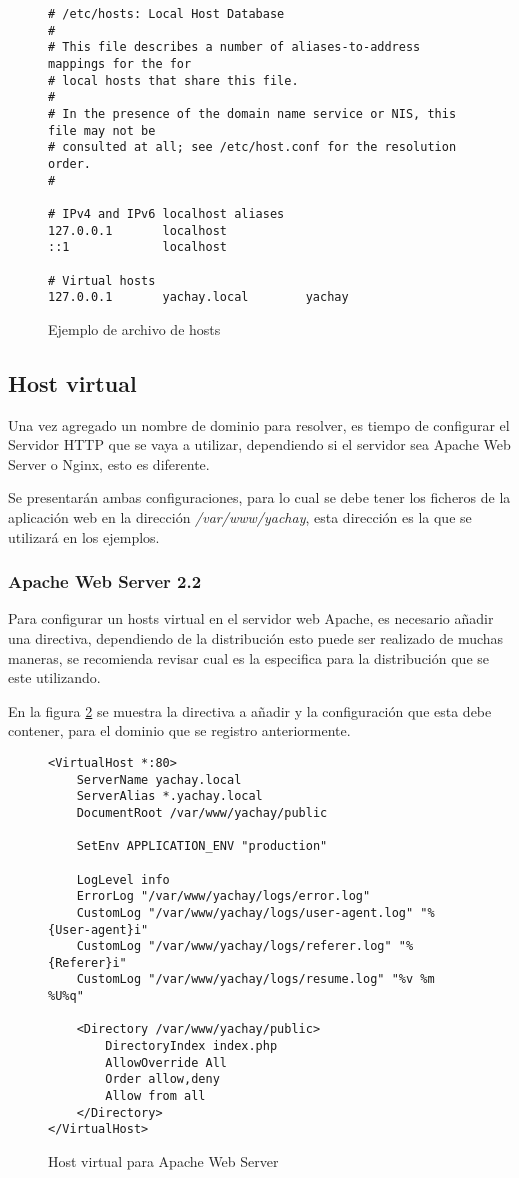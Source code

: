 \begin{figure}
\begin{verbatim}
# /etc/hosts: Local Host Database
#
# This file describes a number of aliases-to-address mappings for the for 
# local hosts that share this file.
#
# In the presence of the domain name service or NIS, this file may not be 
# consulted at all; see /etc/host.conf for the resolution order.
#

# IPv4 and IPv6 localhost aliases
127.0.0.1       localhost
::1             localhost

# Virtual hosts
127.0.0.1       yachay.local        yachay
\end{verbatim}
\caption{Ejemplo de archivo de hosts}
\label{config_hosts}
\end{figure}

\subsection{Host virtual}
Una vez agregado un nombre de dominio para resolver, es tiempo de configurar el
Servidor HTTP que se vaya a utilizar, dependiendo si el servidor sea Apache Web
Server o Nginx, esto es diferente.

Se presentarán ambas configuraciones, para lo cual se debe tener los ficheros
de la aplicación web en la dirección \emph{/var/www/yachay}, esta dirección es
la que se utilizará en los ejemplos.

\subsubsection{Apache Web Server 2.2}
Para configurar un hosts virtual en el servidor web Apache, es necesario añadir
una directiva, dependiendo de la distribución esto puede ser realizado de muchas
maneras, se recomienda revisar cual es la especifica para la distribución que se
este utilizando.

En la figura \ref{config_apache} se muestra la directiva a añadir y la
configuración que esta debe contener, para el dominio que se registro
anteriormente.

\begin{figure}
\begin{verbatim}
<VirtualHost *:80>
    ServerName yachay.local
    ServerAlias *.yachay.local
    DocumentRoot /var/www/yachay/public

    SetEnv APPLICATION_ENV "production"

    LogLevel info
    ErrorLog "/var/www/yachay/logs/error.log"
    CustomLog "/var/www/yachay/logs/user-agent.log" "%{User-agent}i"
    CustomLog "/var/www/yachay/logs/referer.log" "%{Referer}i"
    CustomLog "/var/www/yachay/logs/resume.log" "%v %m %U%q"

    <Directory /var/www/yachay/public>
        DirectoryIndex index.php
        AllowOverride All
        Order allow,deny
        Allow from all
    </Directory>
</VirtualHost>
\end{verbatim}
\caption{Host virtual para Apache Web Server}
\label{config_apache}
\end{figure}

